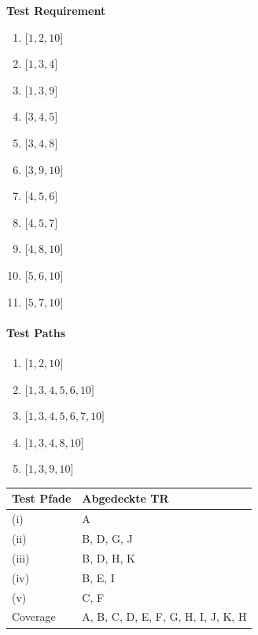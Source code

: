 \documentclass[ngerman]{article}
\begin{document}
\begin{paracol}{2}
 \textbf{Test Requirement}
\begin{enumerate}[label=\Alph*]
\item $\lbrack 1,2,10 \rbrack$
\item $\lbrack 1,3,4\rbrack$
\item $\lbrack 1,3,9\rbrack$
\item $\lbrack 3,4,5\rbrack$
\item $\lbrack 3,4,8\rbrack$
\item $\lbrack 3,9,10\rbrack$
\item $\lbrack 4,5,6\rbrack$
\item $\lbrack 4,5,7\rbrack$
\item $\lbrack 4,8,10\rbrack$
\item $\lbrack 5,6,10\rbrack$
\item $\lbrack 5,7,10\rbrack$
\end{enumerate}

\switchcolumn
\paragraph{Test Paths}
\begin{enumerate}[label=(\roman*)]
\item $\lbrack 1, 2, 10 \rbrack$
\item $\lbrack 1, 3, 4, 5, 6, 10\rbrack$
\item $\lbrack 1, 3, 4, 5, 6, 7, 10\rbrack$
\item $\lbrack 1, 3, 4, 8, 10\rbrack$
\item $\lbrack 1, 3, 9, 10\rbrack$
\end{enumerate}

\begin{table}
\begin{tabular}{|l|p{2.5cm}|}
\hline
\textbf{Test Pfade} & \textbf{Abgedeckte TR} \\ \hline \hline
(i) & A\\ \hline
(ii)  & B, D, G, J \\ \hline
(iii) & B, D, H, K\\ \hline
(iv) & B, E, I\\ \hline
(v) & C, F\\ \hline \hline
Coverage & A, B, C, D, E, F, G, H, I, J, K, H\\ \hline
\end{tabular}
\end{table}

\end{paracol}
\end{document}
